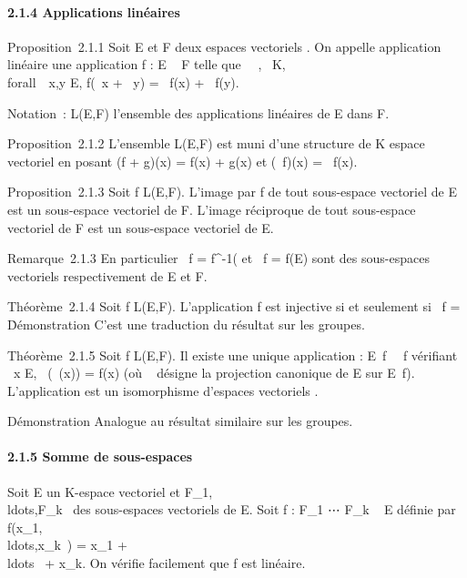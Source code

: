 \paragraph{2.1.4 Applications linéaires}

Proposition~2.1.1 Soit E et F deux espaces vectoriels . On appelle
application linéaire une application f : E \rightarrow~ F telle que
\forall~\alpha~,\beta~ \in K, \\forall~~x,y \in E,
f(\alpha~x + \beta~y) = \alpha~f(x) + \beta~f(y).

Notation~: L(E,F) l'ensemble des applications linéaires de E dans F.

Proposition~2.1.2 L'ensemble L(E,F) est muni d'une structure de K espace
vectoriel en posant (f + g)(x) = f(x) + g(x) et (\lambda~f)(x) = \lambda~f(x).

Proposition~2.1.3 Soit f \in L(E,F). L'image par f de tout sous-espace
vectoriel de E est un sous-espace vectoriel de F. L'image réciproque de
tout sous-espace vectoriel de F est un sous-espace vectoriel de E.

Remarque~2.1.3 En particulier
\mathrmKer~f =
f^-1(\0\) et
\mathrmIm~f = f(E) sont des
sous-espaces vectoriels respectivement de E et F.

Théorème~2.1.4 Soit f \in L(E,F). L'application f est injective si et
seulement si \mathrmKer~f =
\0\.

Démonstration C'est une traduction du résultat sur les groupes.

Théorème~2.1.5 Soit f \in L(E,F). Il existe une unique application
\overlinef :
E\diagup\mathrmKer~f
\rightarrow~\mathrmIm~f vérifiant
\forall~x \in E, \overlinef~(\pi~(x)) =
f(x) (où \pi~ désigne la projection canonique de E sur
E\diagup\mathrmKer~f).
L'application \overlinef est un isomorphisme
d'espaces vectoriels .

Démonstration Analogue au résultat similaire sur les groupes.

\paragraph{2.1.5 Somme de sous-espaces}

Soit E un K-espace vectoriel et
F_1,\\ldots,F_k~
des sous-espaces vectoriels de E. Soit f : F_1
\times⋯ \times F_k \rightarrow~ E définie par
f(x_1,\\ldots,x_k~)
= x_1 +
\\ldots~ +
x_k. On vérifie facilement que f est linéaire.

